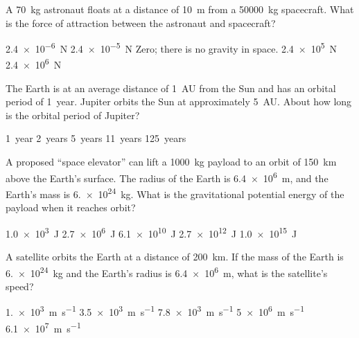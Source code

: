 \documentclass{../../../oss-apphys-exam}
\begin{document}
\genheader


\genmultidirections

\gengravity

\raggedcolumns
\begin{multicols*}{2}
  \begin{questions}
    \question A \SI{70}{\kilo\gram} astronaut floats at a distance of
    \SI{10}{\metre} from a \SI{50000}{\kilo\gram} spacecraft. What is the force
    of attraction between the astronaut and spacecraft?
    \begin{choices}
      \choice\SI{2.4e-6}{\newton}
      \choice\SI{2.4e-5}{\newton}
      \choice Zero; there is no gravity in space.
      \choice\SI{2.4e5}{\newton}
      \choice\SI{2.4e6}{\newton}
    \end{choices}
    
    \question The Earth is at an average distance of \SI{1}{AU} from the Sun
    and has an orbital period of \SI{1}{year}. Jupiter orbits the Sun at
    approximately \SI{5}{AU}. About how long is the orbital period of Jupiter?
    \begin{choices}
      \choice\SI{1}{year}
      \choice\SI{2}{years}
      \choice\SI{5}{years}
      \choice\SI{11}{years}
      \choice\SI{125}{years}
    \end{choices}
    
    \question A proposed ``space elevator'' can lift a \SI{1000}{\kilo\gram}
    payload to an orbit of \SI{150}{\kilo\metre} above the Earth's surface. The
    radius of the Earth is \SI{6.4e6}{\metre}, and the Earth's mass is
    \SI{6.e24}{\kilo\gram}. What is the gravitational potential energy of the
    payload when it reaches orbit?
    \begin{choices}
      \choice\SI{1.0e3}{\joule}
      \choice\SI{2.7e6}{\joule}
      \choice\SI{6.1e10}{\joule}
      \choice\SI{2.7e12}{\joule}
      \choice\SI{1.0e15}{\joule}
    \end{choices}
    
    \question A satellite orbits the Earth at a distance of
    \SI{200}{\kilo\metre}. If the mass of the Earth is \SI{6.e24}{\kilo\gram}
    and the Earth's radius is \SI{6.4e6}{\metre}, what is the satellite's speed?
    \begin{choices}
      \choice\SI{1.e3}{\metre\per\second}
      \choice\SI{3.5e3}{\metre\per\second}
      \choice\SI{7.8e3}{\metre\per\second}
      \choice\SI{5e6}{\metre\per\second}
      \choice\SI{6.1e7}{\metre\per\second}
    \end{choices}
    \columnbreak
    

\end{questions}
\end{multicols*}
\end{document}
